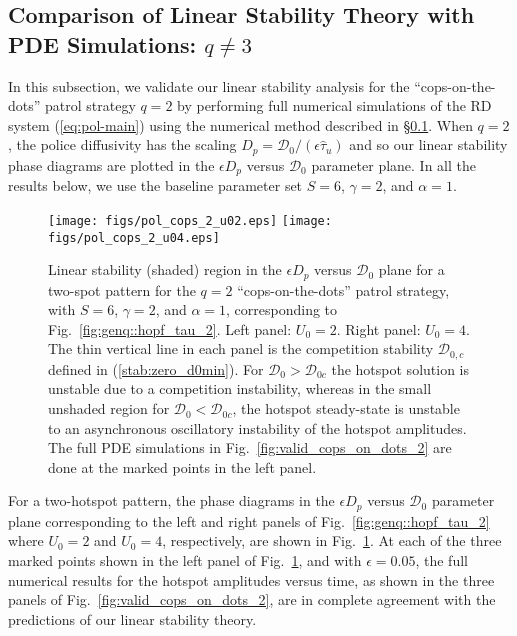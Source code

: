 \documentclass{article}%
\begin{document}
\subsection{Comparison of Linear Stability Theory with PDE Simulations: 
$q\neq 3$}\label{sec:numerics_qn3}


In this subsection, we validate our linear stability analysis for the
``cops-on-the-dots'' patrol strategy $q=2$ by performing full
numerical simulations of the RD system (\ref{eq:pol-main}) using the
numerical method described in \S \ref{sec:numerics_qn3}. When $q=2$,
the police diffusivity has the scaling $D_p={{\mathcal D}_0/(\epsilon
  \hat{\tau}_u)}$ and so our linear stability phase diagrams are
plotted in the $\epsilon D_p$ versus ${\mathcal D}_0$ parameter
plane. In all the results below, we use the baseline parameter set
$S=6$, $\gamma=2$, and $\alpha=1$.

\begin{figure}[htbp]
\centering
\texttt{[image: figs/pol\_cops\_2\_u02.eps]}
\texttt{[image: figs/pol\_cops\_2\_u04.eps]}
\caption{\label{fig:pol_copdots_2} Linear stability (shaded) region in
  the $\epsilon D_p$ versus ${\mathcal D}_0$ plane for a two-spot pattern
  for the $q=2$  ``cops-on-the-dots'' patrol strategy,
  with $S=6$, $\gamma=2$, and $\alpha=1$, corresponding to
  Fig.~\ref{fig:genq::hopf_tau_2}. Left panel: $U_0=2$. Right panel:
  $U_0=4$. The thin vertical line in each panel is the competition
  stability ${\mathcal D}_{0,c}$ defined in
  (\ref{stab:zero_d0min}). For ${\mathcal D}_0>{\mathcal D}_{0c}$ the
  hotspot solution is unstable due to a competition instability,
  whereas in the small unshaded region for ${\mathcal D}_0<{\mathcal
    D}_{0c}$, the hotspot steady-state is unstable to an asynchronous
  oscillatory instability of the hotspot amplitudes. The full PDE
  simulations in Fig.~\ref{fig:valid_cops_on_dots_2} are done at the
  marked points in the left panel.}
\end{figure}

For a two-hotspot pattern, the phase diagrams in the $\epsilon D_p$
versus ${\mathcal D}_0$ parameter plane corresponding to the left and
right panels of Fig.~\ref{fig:genq::hopf_tau_2} where $U_0=2$ and
$U_0=4$, respectively, are shown in Fig.~\ref{fig:pol_copdots_2}. At each
of the three marked points shown in the left panel of 
Fig.~\ref{fig:pol_copdots_2}, and with $\epsilon=0.05$,
the full numerical results for the hotspot amplitudes versus time, as
shown in the three panels of Fig.~\ref{fig:valid_cops_on_dots_2}, are
in complete agreement with the predictions of our linear stability theory.
\end{document}
